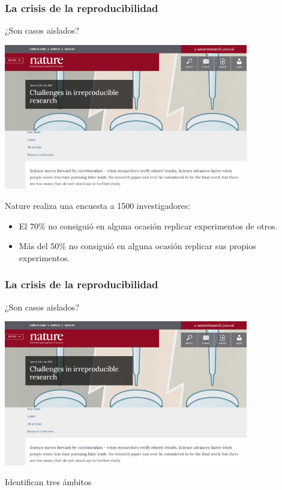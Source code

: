 \documentclass[9pt]{beamer}
\begin{document}
\begin{frame}
  \frametitle{La crisis de la reproducibilidad}
    \begin{overlayarea}{\textwidth}{\textheight}
  ¿Son casos aislados?\\ 
    \begin{center}
    \includegraphics[width=0.8\textwidth]{images/nature_irreproducible_research}
  \end{center}
Nature realiza una encuesta a 1500 investigadores:
\begin{center}
\begin{block}{}
    \begin{itemize}
    \item<4-> El 70\% no consiguió en alguna ocasión replicar experimentos de otros.
    \item<4-> Más del 50\% no consiguió en alguna ocasión replicar sus propios experimentos.
    \end{itemize}
  \end{block}
\end{center}
\end{overlayarea}
\end{frame}

\begin{frame}
  \frametitle{La crisis de la reproducibilidad}
    \begin{overlayarea}{\textwidth}{\textheight}
  ¿Son casos aislados?\\ 
    \begin{center}
    \includegraphics[width=0.8\textwidth]{images/nature_irreproducible_research}
  \end{center}
Identifican tres ámbitos
\begin{center}
\end{center}
\end{overlayarea}
\end{frame}
\end{document}
